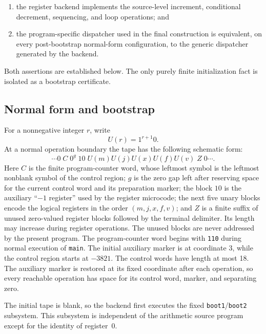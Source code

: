 \documentclass[10pt]{article}
\theoremstyle{definition}
\begin{document}
\begin{enumerate}[label=(\alph*)]
\item the register backend implements the source-level increment, conditional
decrement, sequencing, and loop operations; and
\item the program-specific dispatcher used in the final construction is
equivalent, on every post-bootstrap normal-form configuration, to the generic
dispatcher generated by the backend.
\end{enumerate}

Both assertions are established below.  The only purely finite initialization
fact is isolated as a bootstrap certificate.

\subsection{Normal form and bootstrap}

For a nonnegative integer $r$, write
\[
U(r)=1^{r+1}0.
\]
At a normal operation boundary the tape has the following schematic form:
\begin{equation}
\label{eq:tapenormal}
\cdots 0\;
C\;0^g\;10\;
U(m)U(j)U(x)U(f)U(v)\;Z\;
0\cdots .
\end{equation}
Here $C$ is the finite program-counter word, whose leftmost symbol is the
leftmost nonblank symbol of the control region; $g$ is the zero gap left after
reserving space for the current control word and its preparation marker;
the block $10$ is the auxiliary ``$-1$ register'' used by the register
microcode; the next five unary blocks encode the logical registers in the
order $(m,j,x,f,v)$; and $Z$ is a finite suffix of unused zero-valued register
blocks followed by the terminal delimiter. Its length may increase during
register operations.  The unused blocks are never
addressed by the present program.  The program-counter word begins with
\texttt{110} during normal execution of \texttt{main}. The initial auxiliary
marker is at coordinate $3$, while the control region starts at $-3821$.
The control words have length at most 18. The auxiliary marker is restored at
its fixed coordinate after each operation, so every reachable operation has
space for its control word, marker, and separating zero.

The initial tape is blank, so the backend first executes the fixed
\texttt{boot1}/\texttt{boot2} subsystem.  This subsystem is independent of the
arithmetic source program except for the identity of register~0.
\end{document}
